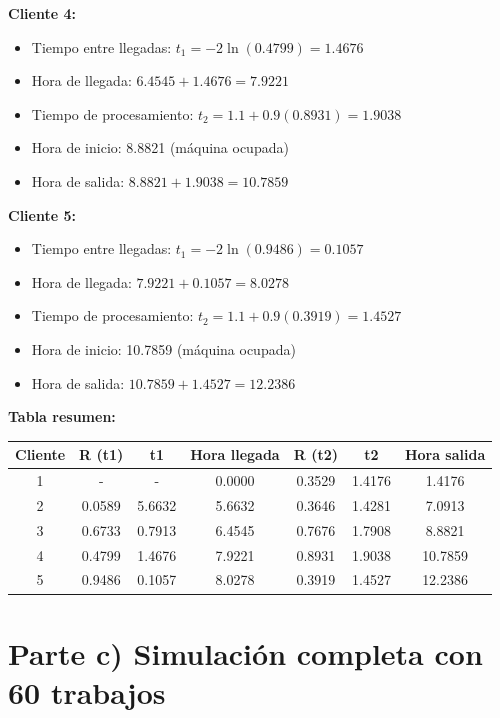 \documentclass{article}
\begin{document}
\textbf{Cliente 4:}
\begin{itemize}
    \item Tiempo entre llegadas: $t_1 = -2\ln(0.4799) = 1.4676$
    \item Hora de llegada: $6.4545 + 1.4676 = 7.9221$
    \item Tiempo de procesamiento: $t_2 = 1.1 + 0.9(0.8931) = 1.9038$
    \item Hora de inicio: 8.8821 (máquina ocupada)
    \item Hora de salida: $8.8821 + 1.9038 = 10.7859$
\end{itemize}

\textbf{Cliente 5:}
\begin{itemize}
    \item Tiempo entre llegadas: $t_1 = -2\ln(0.9486) = 0.1057$
    \item Hora de llegada: $7.9221 + 0.1057 = 8.0278$
    \item Tiempo de procesamiento: $t_2 = 1.1 + 0.9(0.3919) = 1.4527$
    \item Hora de inicio: 10.7859 (máquina ocupada)
    \item Hora de salida: $10.7859 + 1.4527 = 12.2386$
\end{itemize}

\vspace{0.5cm}
\textbf{Tabla resumen:}

\vspace{0.3cm}
\begin{center}
\begin{tabular}{|c|c|c|c|c|c|c|}
\hline
\textbf{Cliente} & \textbf{R (t1)} & \textbf{t1} & \textbf{Hora llegada} & \textbf{R (t2)} & \textbf{t2} & \textbf{Hora salida} \\
\hline
1 & - & - & 0.0000 & 0.3529 & 1.4176 & 1.4176 \\
2 & 0.0589 & 5.6632 & 5.6632 & 0.3646 & 1.4281 & 7.0913 \\
3 & 0.6733 & 0.7913 & 6.4545 & 0.7676 & 1.7908 & 8.8821 \\
4 & 0.4799 & 1.4676 & 7.9221 & 0.8931 & 1.9038 & 10.7859 \\
5 & 0.9486 & 0.1057 & 8.0278 & 0.3919 & 1.4527 & 12.2386 \\
\hline
\end{tabular}
\end{center}

\newpage

\section*{Parte c) Simulación completa con 60 trabajos}
\end{document}
